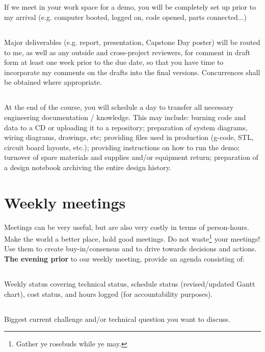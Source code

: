 \documentclass[10pt,courier]{navymemo}
\begin{document}
\subsection{} If we meet in your work space for a demo, you will be completely set up prior to my arrival (e.g. computer booted, logged on, code opened, parts connected...)
\subsection{} Major deliverables (e.g. report, presentation, Capstone Day poster) will be routed to me, as well as any outside and cross-project reviewers, for comment in draft form at least one week prior to the due date, so that you have time to incorporate my comments on the drafts into the final versions.  Concurrences shall be obtained where appropriate. 
\subsection{} At the end of the course, you will schedule a day to transfer all necessary engineering documentation / knowledge.  This may include: burning code and data to a CD or uploading it to a repository; preparation of system diagrams, wiring diagrams, drawings, etc; providing files used in production (g-code, STL, circuit board layouts, etc.); providing instructions on how to run the demo; turnover of spare materials and supplies and/or equipment return; preparation of a design notebook archiving the entire design history. 

\section{Weekly meetings}  Meetings can be very useful, but are also very costly in terms of person-hours.  Make the world a better place, hold good meetings.  Do not waste\footnote{Gather ye rosebuds while ye may.}  your meetings! Use them to create buy-in/consensus and to drive towards decisions and actions.  \textbf{The evening prior} to our weekly meeting, provide an agenda consisting of:
\subsection{} Weekly status covering technical status, schedule status (revised/updated Gantt chart), cost status, and hours logged (for accountability purposes). 
\subsection{} Biggest current challenge and/or technical question you want to discuss.
\end{document}

